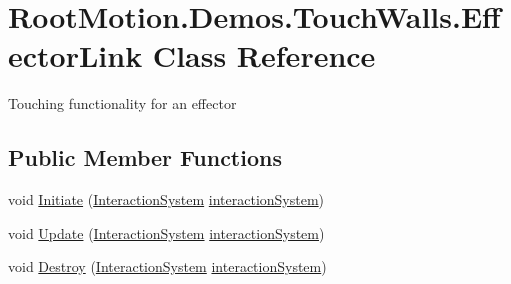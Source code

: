 \hypertarget{class_root_motion_1_1_demos_1_1_touch_walls_1_1_effector_link}{}\section{Root\+Motion.\+Demos.\+Touch\+Walls.\+Effector\+Link Class Reference}
\label{class_root_motion_1_1_demos_1_1_touch_walls_1_1_effector_link}


Touching functionality for an effector  


\subsection*{Public Member Functions}
\begin{DoxyCompactItemize}
\item 
void \mbox{\hyperlink{class_root_motion_1_1_demos_1_1_touch_walls_1_1_effector_link_aaf3747ff183dc5646f7848bacd1c8a68}{Initiate}} (\mbox{\hyperlink{class_root_motion_1_1_final_i_k_1_1_interaction_system}{Interaction\+System}} \mbox{\hyperlink{class_root_motion_1_1_demos_1_1_touch_walls_aaf86751db277b9b271d627f6a1229281}{interaction\+System}})
\item 
void \mbox{\hyperlink{class_root_motion_1_1_demos_1_1_touch_walls_1_1_effector_link_a3dfcc54cf99e52df6cf82297f2bc5108}{Update}} (\mbox{\hyperlink{class_root_motion_1_1_final_i_k_1_1_interaction_system}{Interaction\+System}} \mbox{\hyperlink{class_root_motion_1_1_demos_1_1_touch_walls_aaf86751db277b9b271d627f6a1229281}{interaction\+System}})
\item 
void \mbox{\hyperlink{class_root_motion_1_1_demos_1_1_touch_walls_1_1_effector_link_a65670aa39db4bf9dbc93ed717c2436ef}{Destroy}} (\mbox{\hyperlink{class_root_motion_1_1_final_i_k_1_1_interaction_system}{Interaction\+System}} \mbox{\hyperlink{class_root_motion_1_1_demos_1_1_touch_walls_aaf86751db277b9b271d627f6a1229281}{interaction\+System}})
\end{DoxyCompactItemize}

